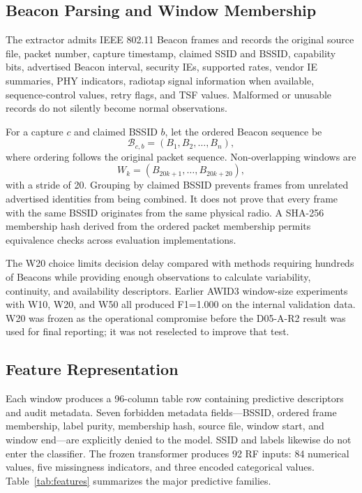 \documentclass[conference]{IEEEtran}
\begin{document}
\subsection{Beacon Parsing and Window Membership}

The extractor admits IEEE 802.11 Beacon frames and records the original source file, packet number, capture timestamp, claimed SSID and BSSID, capability bits, advertised Beacon interval, security IEs, supported rates, vendor IE summaries, PHY indicators, radiotap signal information when available, sequence-control values, retry flags, and TSF values. Malformed or unusable records do not silently become normal observations.

For a capture $c$ and claimed BSSID $b$, let the ordered Beacon sequence be
\begin{equation}
\mathcal{B}_{c,b}=\left(B_1,B_2,\ldots,B_n\right),
\end{equation}
where ordering follows the original packet sequence. Non-overlapping windows are
\begin{equation}
W_k=\left(B_{20k+1},\ldots,B_{20k+20}\right),
\label{eq:window}
\end{equation}
with a stride of 20. Grouping by claimed BSSID prevents frames from unrelated advertised identities from being combined. It does not prove that every frame with the same BSSID originates from the same physical radio. A SHA-256 membership hash derived from the ordered packet membership permits equivalence checks across evaluation implementations.

The W20 choice limits decision delay compared with methods requiring hundreds of Beacons while providing enough observations to calculate variability, continuity, and availability descriptors. Earlier AWID3 window-size experiments with W10, W20, and W50 all produced F1=1.000 on the internal validation data. W20 was frozen as the operational compromise before the D05-A-R2 result was used for final reporting; it was not reselected to improve that test.

\subsection{Feature Representation}

Each window produces a 96-column table row containing predictive descriptors and audit metadata. Seven forbidden metadata fields---BSSID, ordered frame membership, label purity, membership hash, source file, window start, and window end---are explicitly denied to the model. SSID and labels likewise do not enter the classifier. The frozen transformer produces 92 RF inputs: 84 numerical values, five missingness indicators, and three encoded categorical values. Table~\ref{tab:features} summarizes the major predictive families.
\end{document}
